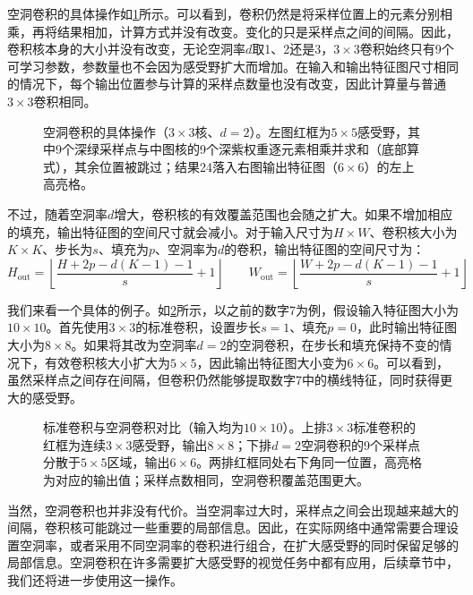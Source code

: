 空洞卷积的具体操作如\cref{fig:dilated}所示。可以看到，卷积仍然是将采样位置上的元素分别相乘，再将结果相加，计算方式并没有改变。变化的只是采样点之间的间隔。因此，卷积核本身的大小并没有改变，无论空洞率$d$取1、2还是3，$3\times3$卷积始终只有9个可学习参数，参数量也不会因为感受野扩大而增加。在输入和输出特征图尺寸相同的情况下，每个输出位置参与计算的采样点数量也没有改变，因此计算量与普通$3\times3$卷积相同。

\begin{figure}[H]
    \caption{空洞卷积的具体操作（$3\times 3$核、$d=2$）。左图红框为$5\times 5$感受野，其中9个深绿采样点与中图核的9个深紫权重逐元素相乘并求和（底部算式），其余位置被跳过；结果24落入右图输出特征图（$6\times 6$）的左上高亮格。}
    \label{fig:dilated}
\end{figure}

不过，随着空洞率$d$增大，卷积核的有效覆盖范围也会随之扩大。如果不增加相应的填充，输出特征图的空间尺寸就会减小。对于输入尺寸为$H\times W$、卷积核大小为$K\times K$、步长为$s$、填充为$p$、空洞率为$d$的卷积，输出特征图的空间尺寸为：
$$
H_{\mathrm{out}} = \left\lfloor \frac{H+2p-d(K-1)-1}{s}+1 \right\rfloor \qquad W_{\mathrm{out}} = \left\lfloor \frac{W+2p-d(K-1)-1}{s}+1 \right\rfloor
$$

我们来看一个具体的例子。如\cref{fig:dilated_example}所示，以之前的数字7为例，假设输入特征图大小为$10\times10$。首先使用$3\times3$的标准卷积，设置步长$s=1$、填充$p=0$，此时输出特征图大小为$8\times8$。如果将其改为空洞率$d=2$的空洞卷积，在步长和填充保持不变的情况下，有效卷积核大小扩大为$5\times5$，因此输出特征图大小变为$6\times6$。可以看到，虽然采样点之间存在间隔，但卷积仍然能够提取数字7中的横线特征，同时获得更大的感受野。

\begin{figure}[H]
    \caption{标准卷积与空洞卷积对比（输入均为$10\times 10$）。上排$3\times 3$标准卷积的红框为连续$3\times 3$感受野，输出$8\times 8$；下排$d=2$空洞卷积的9个采样点分散于$5\times 5$区域，输出$6\times 6$。两排红框同处右下角同一位置，高亮格为对应的输出值；采样点数相同，空洞卷积覆盖范围更大。}
    \label{fig:dilated_example}
\end{figure}

当然，空洞卷积也并非没有代价。当空洞率过大时，采样点之间会出现越来越大的间隔，卷积核可能跳过一些重要的局部信息。因此，在实际网络中通常需要合理设置空洞率，或者采用不同空洞率的卷积进行组合，在扩大感受野的同时保留足够的局部信息。空洞卷积在许多需要扩大感受野的视觉任务中都有应用，后续章节中，我们还将进一步使用这一操作。

